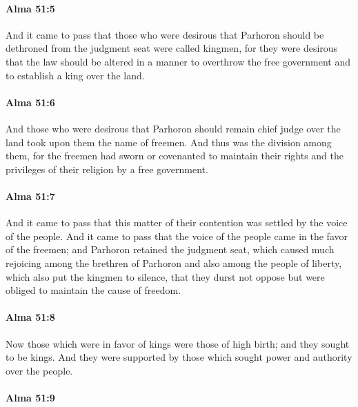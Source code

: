 		\paragraph{Alma 51:5} %
			\label{ALMA-51-5}

			And it came to pass that those who were desirous
			that Parhoron should be dethroned from the judgment seat
			were called kingmen,
			for they were desirous that the law should be altered in a manner
			to overthrow the free government and to establish a king over the land.

		\paragraph{Alma 51:6} %
			\label{ALMA-51-6}

			And those who were desirous
			that Parhoron should remain chief judge over the land
			took upon them the name of freemen.
			And thus was the division among them,
			for the freemen had sworn or covenanted
			to maintain their rights and the privileges of their religion by a free government.

		\paragraph{Alma 51:7} %
			\label{ALMA-51-7}

			And it came to pass that this matter of their contention
			was settled by the voice of the people.
			And it came to pass that the voice of the people came in the favor of the freemen;
			and Parhoron retained the judgment seat,
			which caused much rejoicing among the brethren of Parhoron
			and also among the people of liberty,
			which also put the kingmen to silence,
			that they durst not oppose
			but were obliged to maintain the cause of freedom.

		\paragraph{Alma 51:8} %
			\label{ALMA-51-8}

			Now those which were in favor of kings were those of high birth;
			and they sought to be kings.
			And they were supported by those
			which sought power and authority over the people.

		\paragraph{Alma 51:9} %
			\label{ALMA-51-9}

